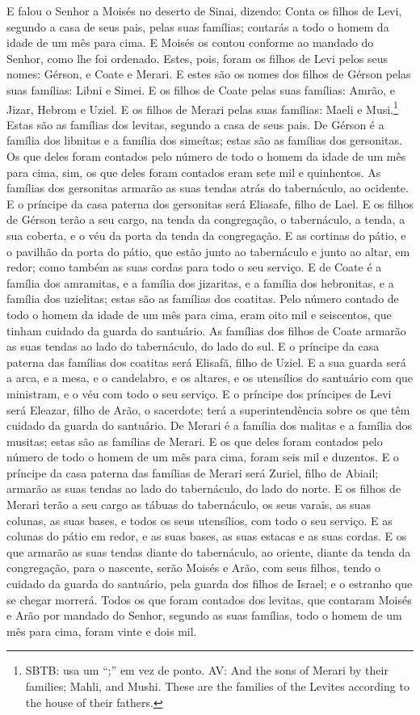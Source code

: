 E falou o Senhor a Moisés no deserto de Sinai, dizendo:
Conta os filhos de Levi, segundo a casa de seus pais, pelas
suas famílias; contarás a todo o homem da idade de um mês para cima.
E Moisés os contou conforme ao mandado do Senhor, como lhe
foi ordenado. Estes, pois, foram os filhos de Levi pelos seus
nomes: Gérson, e Coate e Merari. E estes são os nomes dos
filhos de Gérson pelas suas famílias: Libni e Simei. E os
filhos de Coate pelas suas famílias: Amrão, e Jizar, Hebrom e Uziel.
E os filhos de Merari pelas suas famílias: Maeli e
Musi.\footnote{SBTB: usa um ``;'' em vez de ponto. AV: And the sons
of Merari by their families; Mahli, and Mushi. These are the
families of the Levites according to the house of their fathers. }
Estas são as famílias dos levitas, segundo a casa de seus pais.
De Gérson é a família dos libnitas e a família dos simeítas;
estas são as famílias dos gersonitas. Os que deles foram
contados pelo número de todo o homem da idade de um mês para cima,
sim, os que deles foram contados eram sete mil e quinhentos.
As famílias dos gersonitas armarão as suas tendas atrás do
tabernáculo, ao ocidente. E o príncipe da casa paterna dos
gersonitas será Eliasafe, filho de Lael. E os filhos de
Gérson terão a seu cargo, na tenda da congregação, o tabernáculo, a
tenda, a sua coberta, e o véu da porta da tenda da congregação.
E as cortinas do pátio, e o pavilhão da porta do pátio, que
estão junto ao tabernáculo e junto ao altar, em redor; como também
as suas cordas para todo o seu serviço. E de Coate é a
família dos amramitas, e a família dos jizaritas, e a família dos
hebronitas, e a família dos uzielitas; estas são as famílias dos
coatitas. Pelo número contado de todo o homem da idade de um
mês para cima, eram oito mil e seiscentos, que tinham cuidado da
guarda do santuário. As famílias dos filhos de Coate armarão
as suas tendas ao lado do tabernáculo, do lado do sul. E o
príncipe da casa paterna das famílias dos coatitas será Elisafã,
filho de Uziel. E a sua guarda será a arca, e a mesa, e o
candelabro, e os altares, e os utensílios do santuário com que
ministram, e o véu com todo o seu serviço. E o príncipe dos
príncipes de Levi será Eleazar, filho de Arão, o sacerdote; terá a
superintendência sobre os que têm cuidado da guarda do santuário.
De Merari é a família dos malitas e a família dos musitas;
estas são as famílias de Merari. E os que deles foram
contados pelo número de todo o homem de um mês para cima, foram seis
mil e duzentos. E o príncipe da casa paterna das famílias de
Merari será Zuriel, filho de Abiail; armarão as suas tendas ao lado
do tabernáculo, do lado do norte. E os filhos de Merari terão
a seu cargo as tábuas do tabernáculo, os seus varais, as suas
colunas, as suas bases, e todos os seus utensílios, com todo o seu
serviço. E as colunas do pátio em redor, e as suas bases, as
suas estacas e as suas cordas. E os que armarão as suas
tendas diante do tabernáculo, ao oriente, diante da tenda da
congregação, para o nascente, serão Moisés e Arão, com seus filhos,
tendo o cuidado da guarda do santuário, pela guarda dos filhos de
Israel; e o estranho que se chegar morrerá. Todos os que
foram contados dos levitas, que contaram Moisés e Arão por mandado
do Senhor, segundo as suas famílias, todo o homem de um mês para
cima, foram vinte e dois mil.

